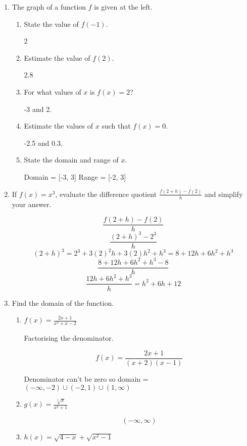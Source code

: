 \documentclass{article}
\begin{document}
\begin{enumerate}
	\item The graph of a function $f$ is given at the left.

	\begin{enumerate}
		\item State the value of $f(-1)$.

			2

		\item Estimate the value of $f(2)$.

			2.8

		\item For what values of $x$ is $f(x) = 2$?

			-3 and 2.

		\item Estimate the values of $x$ such that $f(x) = 0$.

			-2.5 and 0.3.

		\item State the domain and range of $x$.

			Domain = [-3, 3]
			Range = [-2, 3]
		
	\end{enumerate}

	\item If $f(x) = x^{3}$, evaluate the difference quotient $\frac{f(2 + h) - f(2)}{h}$ and simplify your answer.

		$$\frac{f(2 + h) - f(2)}{h}$$
		$$\frac{(2 + h)^3 - 2^3}{h}$$
		$$(2 + h)^3 = 2^3 + 3(2)^2h + 3(2)h^2 +  h^3 = 8 + 12h + 6h^2 + h^3$$
		$$\frac{ 8 + 12h + 6h^2 + h^3 - 8}{h}$$
		$$\frac{12h + 6h^2 + h^3}{h} = h^2 + 6h + 12$$

	\item Find the domain of the function.

	\begin{enumerate}
		\item $f(x) = \frac{2x + 1}{x^2 + x - 2}$

			Factorising the denominator.

			$$f(x) = \frac{2x + 1}{(x+2)(x-1)}$$
			
			Denominator can't be zero so domain = $(-\infty, -2) \cup (-2, 1) \cup (1,\infty)$

		\item $g(x) = \frac{\sqrt[3]{x}}{x^2 + 1}$

			$$(-\infty, \infty)$$

		\item $h(x) = \sqrt{4 - x} + \sqrt{x^2 - 1}$


\end{enumerate}
\end{enumerate}
\end{document}
